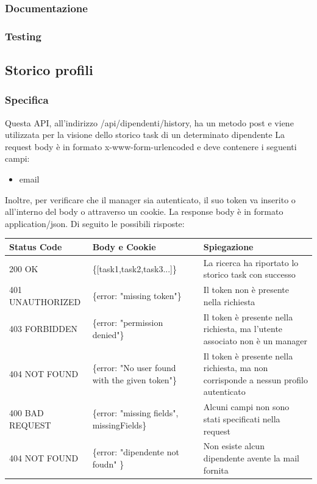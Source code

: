\documentclass{report}
\begin{document}
		\subsubsection*{Documentazione}

		\subsubsection*{Testing}

	\subsection*{Storico profili}
		\subsubsection*{Specifica}
		Questa API, all'indirizzo /api/dipendenti/history, ha un metodo post e viene utilizzata per la visione dello storico task di un determinato dipendente
		La request body è in formato x-www-form-urlencoded e deve contenere i seguenti campi:
		\begin{itemize}
			\item email
		\end{itemize}
		Inoltre, per verificare che il manager sia autenticato, il suo token va inserito o all'interno del body o attraverso un cookie.
		La response body è in formato application/json. Di seguito le possibili risposte:
		\begin{center} %
			\centering
			\begin{tabular}{ |p{4cm}|p{5cm}|p{4cm}| }
				\hline
				\centering Status Code & \qquad\quad Body e Cookie                                & \qquad\qquad Spiegazione                              \\ %
				\hline
				200 OK                 & \{[task1,task2,task3...]\} 			  & La ricerca ha riportato lo storico task con successo                          \\
				\hline
				401 UNAUTHORIZED       & \{error: "missing token"\} 							  & Il token non è presente nella richiesta				  \\
				\hline
				403 FORBIDDEN		   & \{error: "permission denied"\}							  & Il token è presente nella richiesta, ma l'utente associato non è un manager \\	
				\hline
				404 NOT FOUND 		   & \{error: "No user found with the given token"\}          & Il token è presente nella richiesta, ma non corrisponde a nessun profilo autenticato \\
				\hline
				400 BAD REQUEST        & \{error: "missing fields", missingFields\}               & Alcuni campi non sono stati specificati nella request \\ %
				\hline
				404 NOT FOUND 		   & \{error: "dipendente not foudn" \}				  & Non esiste alcun dipendente avente la mail fornita \\
				\hline
			\end{tabular}
		\end{center}
\end{document}
